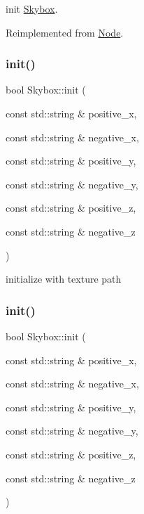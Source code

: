 init \hyperlink{classSkybox}{Skybox}. 

Reimplemented from \hyperlink{classNode}{Node}.

\mbox{\label{classSkybox_a854a496cdc9ae6cbae756c9ff07505c3}} 
\subsubsection{\texorpdfstring{init()}{init()}\hspace{0.1cm}{\footnotesize\ttfamily [3/4]}}
{\footnotesize\ttfamily bool Skybox\+::init (\begin{DoxyParamCaption}\item[{const std\+::string \&}]{positive\+\_\+x,  }\item[{const std\+::string \&}]{negative\+\_\+x,  }\item[{const std\+::string \&}]{positive\+\_\+y,  }\item[{const std\+::string \&}]{negative\+\_\+y,  }\item[{const std\+::string \&}]{positive\+\_\+z,  }\item[{const std\+::string \&}]{negative\+\_\+z }\end{DoxyParamCaption})}

initialize with texture path \mbox{\label{classSkybox_a854a496cdc9ae6cbae756c9ff07505c3}} 
\subsubsection{\texorpdfstring{init()}{init()}\hspace{0.1cm}{\footnotesize\ttfamily [4/4]}}
{\footnotesize\ttfamily bool Skybox\+::init (\begin{DoxyParamCaption}\item[{const std\+::string \&}]{positive\+\_\+x,  }\item[{const std\+::string \&}]{negative\+\_\+x,  }\item[{const std\+::string \&}]{positive\+\_\+y,  }\item[{const std\+::string \&}]{negative\+\_\+y,  }\item[{const std\+::string \&}]{positive\+\_\+z,  }\item[{const std\+::string \&}]{negative\+\_\+z }\end{DoxyParamCaption})}

